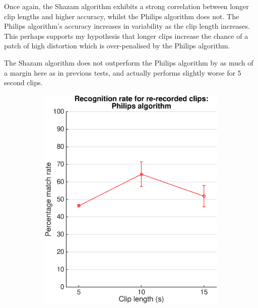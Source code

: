 \documentclass[12pt,a4paper,twoside,openright]{report}
\begin{document}
Once again, the Shazam algorithm exhibits a strong correlation between longer clip lengths and higher accuracy, whilst the Philips algorithm does not. The Philips algorithm's accuracy increases in variability as the clip length increases. This perhaps supports my hypothesis that longer clips increase the chance of a patch of high distortion which is over-penalised by the Philips algorithm.

The Shazam algorithm does not outperform the Philips algorithm by as much of a margin here as in previous tests, and actually performs slightly worse for 5 second clips. 

\begin{figure}[htbp!]
    \centering

    \begin{subfigure}{0.5\textwidth}
    	\centering
     	\includegraphics[width=0.95\linewidth]{./figs/barcoder_passthrough.eps}
    \end{subfigure}%
    ~
    \begin{subfigure}{0.5\textwidth}
    	\centering

\end{subfigure}
\end{figure}
\end{document}
